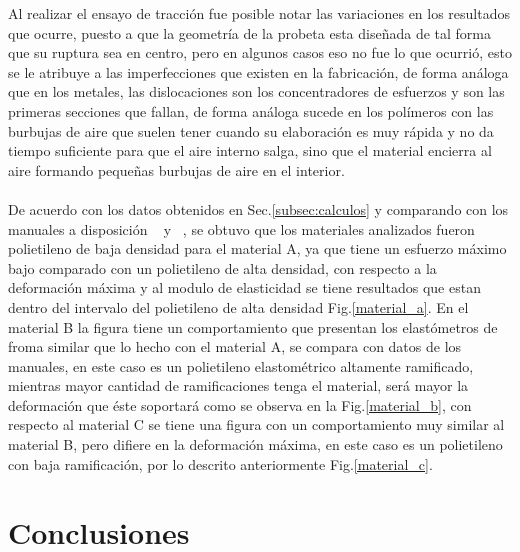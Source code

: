 \documentclass[a4paper, 11pt]{article}
\begin{document}
Al realizar el ensayo de tracción fue posible notar las variaciones en los resultados que ocurre, puesto a que la geometría de la probeta esta diseñada de tal forma que su ruptura sea en centro, pero en algunos casos eso no fue lo que ocurrió, esto se le atribuye a las imperfecciones que existen en la fabricación, de forma análoga que en los metales, las dislocaciones son los concentradores de esfuerzos y son las primeras secciones que fallan, de forma análoga sucede en los polímeros con las burbujas de aire que suelen tener cuando su elaboración es muy rápida y no da tiempo suficiente para que el aire interno salga, sino que el material encierra al aire formando pequeñas burbujas de aire en el interior.\\
\\
De acuerdo con los datos obtenidos en Sec.\ref{subsec:calculos} y comparando con los manuales a disposición ~\cite{no10} y ~\cite{no11}, se obtuvo que los materiales analizados fueron polietileno de baja densidad para el material A, ya que tiene un esfuerzo máximo bajo comparado con un polietileno de alta densidad, con respecto a la deformación máxima y al modulo de elasticidad se tiene resultados que estan dentro del intervalo del polietileno de alta densidad Fig.\ref{material_a}. En el material B la figura tiene un comportamiento que presentan los elastómetros de froma similar que lo hecho con el material A, se compara con datos de los manuales, en este caso es un polietileno elastométrico altamente ramificado, mientras mayor cantidad de ramificaciones tenga el material, será mayor la deformación que éste soportará como se observa en la Fig.\ref{material_b}, con respecto al material C se tiene una figura con un comportamiento muy similar al material B, pero difiere en la deformación máxima, en este caso es un polietileno con baja ramificación, por lo descrito anteriormente Fig.\ref{material_c}.


\section{Conclusiones}
\end{document}
